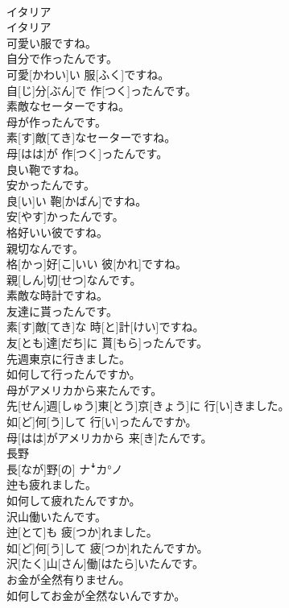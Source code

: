 \documentclass[8pt]{extreport}
\begin{document}
\begin{CJK}{UTF8}{min}
\\	イタリア	
\\	イタリア	
\\	可愛い服ですね。 
\\	自分で作ったんです。	
\\	可愛[かわい]い 服[ふく]ですね。 
\\	自[じ]分[ぶん]で 作[つく]ったんです。
\\	素敵なセーターですね。 
\\	母が作ったんです。	
\\	素[す]敵[てき]なセーターですね。 
\\	母[はは]が 作[つく]ったんです。
\\	良い鞄ですね。 
\\	安かったんです。	
\\	良[い]い 鞄[かばん]ですね。 
\\	安[やす]かったんです。
\\	格好いい彼ですね。 
\\	親切なんです。	
\\	格[かっ]好[こ]いい 彼[かれ]ですね。 
\\	親[しん]切[せつ]なんです。
\\	素敵な時計ですね。 
\\	友達に貰ったんです。	
\\	素[す]敵[てき]な 時[と]計[けい]ですね。 
\\	友[とも]達[だち]に 貰[もら]ったんです。
\\	先週東京に行きました。 
\\	如何して行ったんですか。 
\\	母がアメリカから来たんです。	
\\	先[せん]週[しゅう]東[とう]京[きょう]に 行[い]きました。 
\\	如[ど]何[う]して 行[い]ったんですか。 
\\	母[はは]がアメリカから 来[き]たんです。
\\	長野	
\\	長[なが]野[の]	ナꜜカ°ノ
\\	迚も疲れました。 
\\	如何して疲れたんですか。 
\\	沢山働いたんです。	
\\	迚[とて]も 疲[つか]れました。 
\\	如[ど]何[う]して 疲[つか]れたんですか。 
\\	沢[たく]山[さん]働[はたら]いたんです。
\\	お金が全然有りません。 
\\	如何してお金が全然ないんですか。 

\end{CJK}
\end{document}
